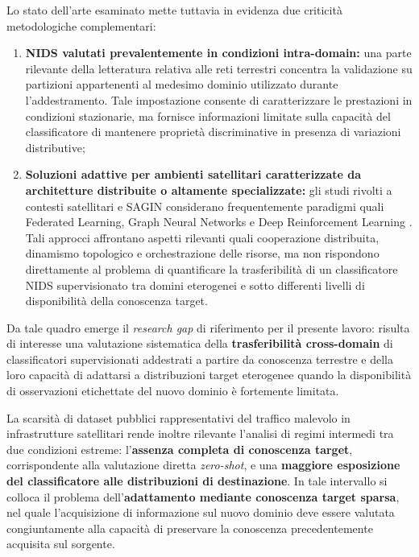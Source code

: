 Lo stato dell'arte esaminato mette tuttavia in evidenza due criticità metodologiche complementari:
\begin{enumerate}
    \item \textbf{NIDS valutati prevalentemente in condizioni intra-domain:} una parte rilevante della letteratura relativa alle reti terrestri concentra la validazione su partizioni appartenenti al medesimo dominio utilizzato durante l'addestramento. 
    Tale impostazione consente di caratterizzare le prestazioni in condizioni stazionarie, ma fornisce informazioni limitate sulla capacità del classificatore di mantenere proprietà discriminative in presenza di variazioni distributive;

    \item \textbf{Soluzioni adattive per ambienti satellitari caratterizzate da architetture distribuite o altamente specializzate:} gli studi rivolti a contesti satellitari e SAGIN considerano frequentemente paradigmi quali Federated Learning, Graph Neural Networks e Deep Reinforcement Learning \cite{wan2025,alam2024}. 
    Tali approcci affrontano aspetti rilevanti quali cooperazione distribuita, dinamismo topologico e orchestrazione delle risorse, ma non rispondono direttamente al problema di quantificare la trasferibilità di un classificatore NIDS supervisionato tra domini eterogenei e sotto differenti livelli di disponibilità della conoscenza target.
\end{enumerate}

Da tale quadro emerge il \textit{research gap} di riferimento per il presente lavoro: risulta di interesse una valutazione sistematica della \textbf{trasferibilità cross-domain} di classificatori supervisionati addestrati a partire da conoscenza terrestre e della loro capacità di adattarsi a distribuzioni target eterogenee quando la disponibilità di osservazioni etichettate del nuovo dominio è fortemente limitata.

La scarsità di dataset pubblici rappresentativi del traffico malevolo in infrastrutture satellitari rende inoltre rilevante l'analisi di regimi intermedi tra due condizioni estreme: l'\textbf{assenza completa di conoscenza target}, corrispondente alla valutazione diretta \textit{zero-shot}, e una \textbf{maggiore esposizione del classificatore alle distribuzioni di destinazione}. 
In tale intervallo si colloca il problema dell'\textbf{adattamento mediante conoscenza target sparsa}, nel quale l'acquisizione di informazione sul nuovo dominio deve essere valutata congiuntamente alla capacità di preservare la conoscenza precedentemente acquisita sul sorgente.

